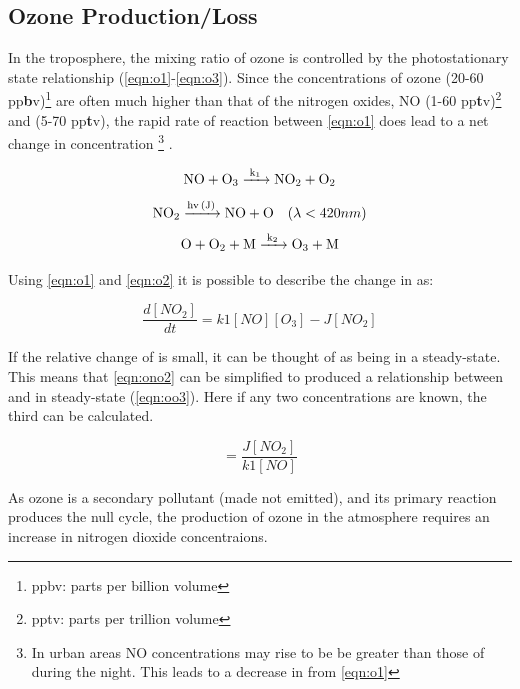 \subsection{Ozone Production/Loss}\label{sec:o3prod}
In the troposphere, the mixing ratio of ozone is controlled by the photostationary state relationship (\autoref{eqn:o1}-\ref{eqn:o3}).
Since the concentrations of ozone (20-60 pp\textbf{b}v)\footnote{ppbv: parts per billion volume} are often much higher than that of the nitrogen oxides, NO (1-60 pp\textbf{t}v)\footnote{pptv: parts per trillion volume} and  (5-70 pp\textbf{t}v), the rapid rate of reaction between \autoref{eqn:o1} does lead to a net change in  concentration \footnote{In urban areas NO concentrations may rise to be be greater than those of  during the night. This leads to a decrease in from \autoref{eqn:o1}} \citep{fundamentals}.



\begin{equation}
  \centering
\ce{NO + O3 ->[k1] NO2 +O2} \label{eqn:o1}
\end{equation}
\begin{equation}
  \centering
 \ce{NO2 ->[hv (J)] NO + O }\ \ \ (\lambda < 420nm) \label{eqn:o2}
\end{equation}
 \begin{equation}
   \centering
\ce{O + O2 + M ->[k2] O3 + M}\label{eqn:o3}
\end{equation}

Using \autoref{eqn:o1} and \autoref{eqn:o2} it is possible to describe the change in  as:

\begin{equation}
  \frac{d[NO_2]}{dt} = k1[NO][O_3] - J[NO_2]
  \label{eqn:ono2}
\end{equation}

If the relative change of  is small, it can be thought of as being in a steady-state. This means that \autoref{eqn:ono2} can be simplified to produced a relationship between  and  in steady-state (\autoref{eqn:oo3}). Here if any two concentrations are known, the third can be calculated.

\begin{equation}
  [O_3] = \frac{J[NO_2]}{k1[NO]}
  \label{eqn:oo3}
\end{equation}

As ozone is a secondary pollutant (made not emitted), and its primary reaction produces the null cycle, the production of ozone in the atmosphere requires an increase in nitrogen dioxide concentraions.

